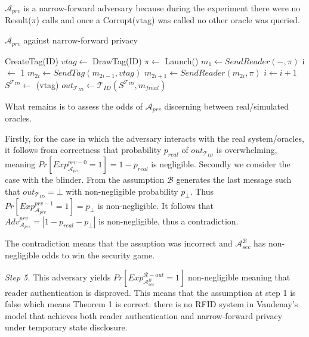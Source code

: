     $\mathcal{A}_{prv}$ is a narrow-forward adversary because during the experiment there were no Result($\pi$) calls and once a Corrupt(vtag) was called 
    no other oracle was queried.

    \begin{algorithm}[H] %
        \centering
        \caption{$\mathcal{A}_{prv}$ against narrow-forward privacy}
        \begin{algorithmic}[1] %
            \State CreateTag(ID)
            \State $vtag \leftarrow$ DrawTag(ID)
            \State $\pi \leftarrow$ Launch() 
            \State $m_1 \leftarrow SendReader(-,\pi)$ 
            \State i $\leftarrow$ 1
                \State $m_{2i} \gets SendTag(m_{2i-1}, vtag)$ 
                \State $m_{2i+1} \gets SendReader(m_{2i}, \pi)$
                \State $i \gets i+1$
            \EndWhile
            \State $S^{\mathcal{T}_{ID}} \gets$ (vtag)
            \State $out_{\mathcal{T}_{ID}} \gets \mathcal{T}_{ID}(S^{\mathcal{T}_{ID}}, m_{final})$
                \State {}
            \Else
                \State {}
            \EndIf
        \end{algorithmic}
    \end{algorithm}

    What remains is to assess the odds of $\mathcal{A}_{prv}$ discerning between real/simulated oracles.

    Firstly, for the case in which the adversary interacts with the real system/oracles, it follows from correctness that probability $p_{real}$ of 
    $out_{\mathcal{T}_{ID}}$ is overwhelming, meaning $Pr[Exp_{\mathcal{A}_{prv}}^{prv-0} = 1] = 1-p_{real}$ is negligible. Secondly we consider the case
    with the blinder. From the assumption $\mathcal{B}$ generates the last message such that $out_{\mathcal{T}_{ID}} = \bot$ with non-negligible probability $p_{\bot}$.
    Thus $Pr[Exp_{\mathcal{A}_{prv}}^{prv-1} = 1] = p_{\bot}$ is non-negligible. It follows that $Adv_{\mathcal{A}_{prv}}^{prv} = |1-p_{real}-p_{\bot}|$ is non-negligible,
    thus a contradiction. 

    The contradiction means that the assuption was incorrect and $\mathcal{A}_{sec}^{\mathcal{B}}$ has non-negligible odds to win the security game.

    \textit{Step 5.} This adversary yields $Pr[Exp_{\mathcal{A}_{sec}^{B}}^{\mathcal{R}-aut} = 1]$ non-negligible meaning that reader authentication is disproved. 
    This means that the assumption at step 1 is false which means Theorem 1 is correct: there is no RFID system in Vaudenay's model that achieves both reader authentication and narrow-forward privacy 
    under temporary state disclosure.

